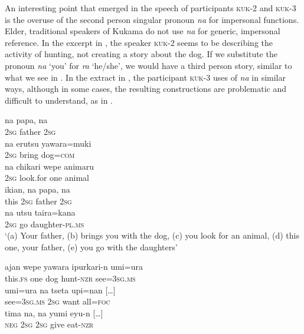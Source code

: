 \documentclass[output=paper]{langscibook}
\begin{document}
An interesting point that emerged in the speech of participants \textsc{kuk-2} and \textsc{kuk-3} is the overuse of the second person singular pronoun \textit{na} for impersonal functions. Elder, traditional speakers of Kukama do not use \textit{na} for generic, impersonal reference. In the excerpt in , the speaker \textsc{kuk}{}-2 seems to be describing the activity of hunting, not creating a story about the dog. If we substitute the pronoun \textit{na} ‘you’ for \textit{ra} ‘he/she’, we would have a third person story, similar to what we see in . In the extract in , the participant \textsc{kuk}{}-3 uses of \textit{na} in similar ways, although in some cases, the resulting constructions are problematic and difficult to understand, as in .


\ea\label{ex:7:4}
\ea\label{ex:7:4a}
\gll na     papa,   na\\
     \textsc{2sg}    father \textsc{2sg}\\
\ex\label{ex:7:4b}
\gll na     erutsu   yawara=muki\\
   \textsc{2sg}    bring  dog=\textsc{com}\\

\ex\label{ex:7:4c}
\gll na     chikari   wepe   animaru\\
    \textsc{2sg}    look.for  one  animal\\

\ex\label{ex:7:4d}
\gll ikian,   na   papa,     na\\
    this    \textsc{2sg}  father     \textsc{2sg}\\
\ex\label{ex:7:4e}
\gll na   utsu   taira=kana\\
   \textsc{2sg}  go  daughter-\textsc{pl.ms}\\
\glt ‘(a) Your father, (b) brings you with the dog, (c) you look for an animal, (d) this one, your father, (e) you go with the daughters’
\z
\z


\ea\label{ex:7:5}
\ea\label{ex:7:5a}
\gll ajan     wepe   yawara   ipurkari-n   umi=ura\\
      this.\textsc{fs}  one  dog    hunt-\textsc{nzr}  see=\textsc{3sg.ms}\\

\ex\label{ex:7:5b}
\gll umi=ura     na   tseta   upi=nan [\ldots]\\
     see=\textsc{3sg.ms}    \textsc{2sg}  want  all=\textsc{foc}\\

\ex\label{ex:7:5c}
\gll tima     na,   na   yumi   eyu-n [\ldots]\\
   \textsc{neg}    \textsc{2sg}  \textsc{2sg}  give  eat-\textsc{nzr}\\
\end{document}
